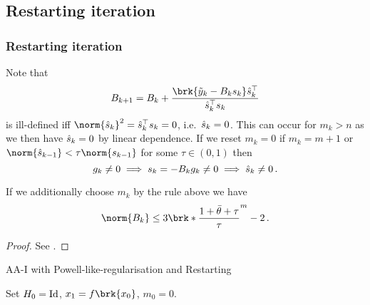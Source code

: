 \subsection{Restarting iteration}
\begin{frame}
	\frametitle{Restarting iteration}
	Note that
	\begin{align*}
		B_{k+1} = B_k+\frac{\brk{\tiy_k-B_ks_k}\hs_k^\top}{\hs_k^\top s_k}
	\end{align*}
	is ill-defined iff $\norm{\hs_k}^2=\hs_k^\top s_k=0$, i.e.\ $\hat{s}_k=0$. This can occur for $m_k>n$ as we then have $\hat{s}_k=0$ by linear dependence.
	If we reset $m_k=0$ if $m_k=m+1$ or $\norm{\hs_{k-1}}<\tau\norm{s_{k-1}}$ for some $\tau\in(0,1)$
	then 
	$$g_k\neq 0 \implies s_k=-B_kg_k\neq 0\implies \hat{s}_k\neq 0\,.$$
\end{frame}

\begin{frame}
	\begin{lemma}
		If we additionally choose $m_k$ by the rule above we have
		\begin{align*}
			\norm{B_k}\leq 3\brk*{\frac{1+\bartheta+\tau}{\tau}}^m-2\,.
		\end{align*}
	\end{lemma}
	\begin{proof}
		See \cite[Lemma 3]{ZhaAA}.
	\end{proof}
\end{frame}

\begin{frame}
	\begin{algorithm}[H]
	\caption{AA-I with Powell-like-regularisation and Restarting}
	\color{gray}
	\BlankLine
	Set $H_0=\operatorname{Id}$, $x_1=f\brk{x_0}$, $m_0 = 0$.
	
	\end{algorithm}
\end{frame}


